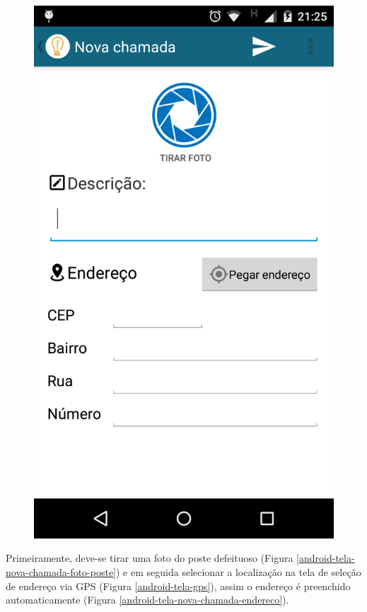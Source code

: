 \documentclass[
	article,			%
	11pt,				%
	oneside,			%
	a4paper,			%
	english,			%
	brazil,				%
	sumario=tradicional
	]{abntex2}
\begin{document}
\begin{figure}[!htbp]
\begin{minipage}{0.4\textwidth}
    \includegraphics[scale=0.1]{android/2.png}
  \end{minipage}
\end{figure}

Primeiramente, deve-se tirar uma foto do poste defeituoso (Figura \ref{android-tela-nova-chamada-foto-poste}) e em
seguida selecionar a localização na tela de seleção de endereço via GPS (Figura
\ref{android-tela-gps}), assim o endereço é preenchido automaticamente (Figura
\ref{android-tela-nova-chamada-endereco}).
\end{document}
